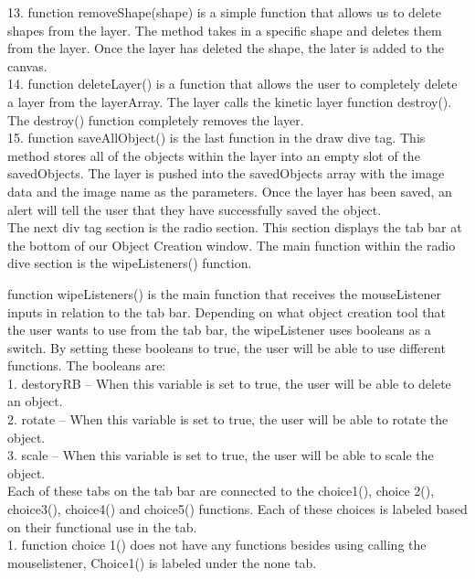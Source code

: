 \documentclass[a4paper, 11pt]{article} %
\begin{document}
13.	function removeShape(shape) is a simple function that allows us to delete shapes from the layer. The method takes in a specific shape and deletes them from the layer. Once the layer has deleted the shape, the later is added to the canvas. \\

14.	function deleteLayer() is a function that allows the user to completely delete a layer from the layerArray. The layer calls the kinetic layer function destroy(). The destroy() function completely removes the layer. \\

15.	function saveAllObject() is the last function in the draw dive tag. This method stores all of the objects within the layer into an empty slot of the savedObjects. The layer is pushed into the savedObjects array with the image data and the image name as the parameters. Once the layer has been saved, an alert will tell the user that they have successfully saved the object.\\

The next div tag section is the radio section. This section displays the tab bar at the bottom of our Object Creation window. The main function within the radio dive section is the wipeListeners() function.

function wipeListeners() is the main function that receives the mouseListener inputs in relation to the tab bar. Depending on what object creation tool that the user wants to use from the tab bar, the wipeListener uses booleans as a switch. By setting these booleans to true, the user will be able to use different functions. The booleans are:\\

1.	destoryRB – When this variable is set to true, the user will be able to delete an object. \\

2.	rotate – When this variable is set to true, the user will be able to rotate the object. \\

3.	scale – When this variable is set to true, the user will be able to scale the object. \\

Each of these tabs on the tab bar are connected to the choice1(), choice 2(), choice3(), choice4() and choice5() functions. Each of these choices is labeled based on their functional use in the tab. \\

1.	function choice 1() does not have any functions besides using calling the mouselistener, Choice1() is labeled under the none tab.\\
\end{document}
